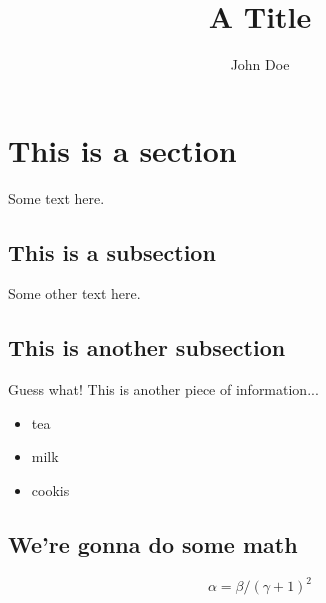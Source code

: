 \documentclass{article}
\title{A Title}
\author{John Doe}
\begin{document}
\maketitle

\section{This is a section}

Some text here.

\subsection{This is a subsection}

Some other text here.

\subsection{This is another subsection}

Guess what!
This is another piece of information...

\begin{itemize}
    \item tea
    \item milk
    \item cookis
\end{itemize}

\subsection{We're gonna do some math}
\begin{equation}
    \alpha = \beta /(\gamma + 1)^2
\end{equation}
\end{document}
